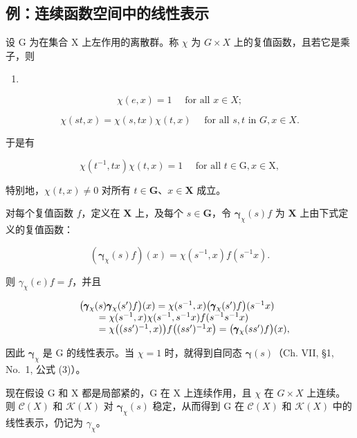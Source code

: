 \subsection{例：连续函数空间中的线性表示}

设 G 为在集合 X 上左作用的离散群。称 \(\chi\) 为 \(G \times X\) 上的复值函数，且若它是乘子，则

\begin{enumerate}
\def\labelenumi{(\arabic{enumi})}
\tightlist
\item
\end{enumerate}

\[
\chi (e, x) = 1 \quad \text { for   all } x \in X;\tag{2}
\]

\[
\chi (s t, x) = \chi (s, t x) \chi (t, x) \quad \text { for   all } s, t \text { in } G, x \in X.
\]

于是有

\[
\chi (t ^ {- 1}, t x) \chi (t, x) = 1 \quad \text { for   all } t \in \mathrm{G}, x \in \mathrm{X},\tag{3}
\]

特别地，\(\chi(t, x) \neq 0\) 对所有 \(t \in \mathbf{G}\)、\(x \in \mathbf{X}\) 成立。

对每个复值函数 \(f\)，定义在 \(\mathbf{X}\) 上，及每个 \(s \in \mathbf{G}\)，令 \(\pmb{\gamma}_{\chi}(s)f\) 为 \(\mathbf{X}\) 上由下式定义的复值函数：

\[
\left(\boldsymbol {\gamma} _ {\chi} (s) f\right) (x) = \chi (s ^ {- 1}, x) f (s ^ {- 1} x).\tag{4}
\]

则 \(\gamma_{\chi}(e)f = f\)，并且

\[
\begin{array}{r l} & {\big (\pmb {\gamma} _ {\chi} (s) \pmb {\gamma} _ {\chi} (s ^ {\prime}) f \big) (x) = \chi (s ^ {- 1}, x) \big (\pmb {\gamma} _ {\chi} (s ^ {\prime}) f \big) (s ^ {- 1} x)} \\ & {\qquad = \chi (s ^ {- 1}, x) \chi (s ^ {- 1}, s ^ {- 1} x) f (s ^ {- 1} s ^ {- 1} x)} \\ & {\qquad = \chi \big ((s s ^ {\prime}) ^ {- 1}, x) \big) f \big ((s s ^ {\prime}) ^ {- 1} x \big) = \big (\pmb {\gamma} _ {\chi} (s s ^ {\prime}) f \big) (x),} \end{array}
\]

因此 \(\pmb{\gamma}_{\chi}\) 是 G 的线性表示。当 \(\chi = 1\) 时，就得到自同态 \(\pmb{\gamma}(s)\)（Ch. VII, §1, No.~1, 公式 (3)）。

现在假设 G 和 X 都是局部紧的，G 在 X 上连续作用，且 \(\chi\) 在 \(G \times X\) 上连续。则 \(\mathcal{C}(X)\) 和 \(\mathcal{K}(X)\) 对 \(\boldsymbol{\gamma}_{\chi}(s)\) 稳定，从而得到 G 在 \(\mathcal{C}(X)\) 和 \(\mathcal{K}(X)\) 中的线性表示，仍记为 \(\gamma_{\chi}\)。

